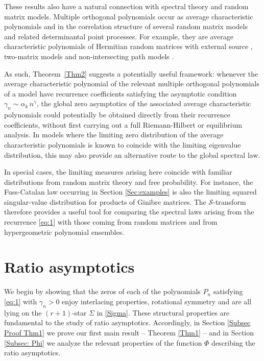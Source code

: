 \documentclass[12pt]{article}
\newcommand{\St}{\mathcal{S}} %
\numberwithin{equation}{section}
\begin{document}
These results also have a natural connection with spectral theory and random matrix models.  Multiple orthogonal polynomials occur as average characteristic polynomials and in the correlation structure of several random matrix models and related determinantal point processes.  For example, they are average characteristic polynomials of Hermitian random matrices with external source  \cite{BleherKuijlaars04}, two-matrix models \cite{DuitsKuijlMo} and non-intersecting path models \cite{DaemsKuijl}.


As such, Theorem~\ref{Thm2} suggests a potentially useful framework: whenever the average characteristic polynomial of the relevant multiple orthogonal polynomials of a model have recurrence coefficients satisfying the asymptotic condition $\gamma_n \sim \alpha_k \, n^\gamma$, the global zero asymptotics of the associated average characteristic polynomials could potentially be obtained directly from their recurrence coefficients, without first carrying out a full Riemann-Hilbert or equilibrium analysis. In models where the limiting zero distribution of the average characteristic polynomials is known to coincide with the limiting eigenvalue distribution, this may also provide an alternative route to the global spectral law.


In special cases, the limiting measures arising here
coincide with familiar distributions from random matrix theory and free
probability. For instance, the Fuss-Catalan law occurring in
Section \ref{Sec:examples} is also the limiting squared singular-value distribution
for products of Ginibre matrices. The $\St$-transform therefore provides a
useful tool for comparing the spectral laws arising from the recurrence
\eqref{eq:1} with those coming from random matrices and from hypergeometric
polynomial ensembles.

\section{Ratio asymptotics}\label{Sec RA}

We begin by showing that the zeros of each of the polynomials  $P_n$ satisfying \eqref{eq:1} with $\gamma_n>0$ 
enjoy interlacing properties, rotational symmetry and are all lying on the $(r+1)$-star $\Sigma $ in \eqref{Sigma}. These structural properties are fundamental to the study of ratio asymptotics. Accordingly, in Section \ref{Subsec Proof Thm1} we prove our first main result -- Theorem \ref{Thm1} -- and in Section \ref{Subsec: Phi} we analyze the relevant properties of the function \(\Phi\) describing the ratio asymptotics. 
 
\end{document}
